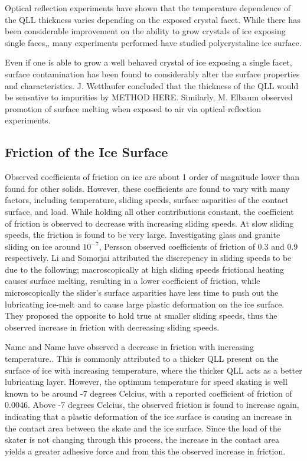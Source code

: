 Optical reflection experiments have shown that the temperature
dependence of the QLL thickness varies depending on the exposed
crystal facet.\cite{Elbaum93} While there has been considerable improvement
on the ability to grow crystals of ice exposing single
faces,\cite{Shultz14, Shultz17}, many experiments performed have studied
polycrystaline ice surface.

Even if one is able to grow a well behaved crystal of ice exposing a
single facet, surface contamination has been found to considerably
alter the surface properties and characteristics. J. Wettlaufer
concluded that the thickness of the QLL would be sensative to
impurities by METHOD HERE.\cite{Wettlaufer99} Similarly, M. Elbaum observed
promotion of surface melting when exposed to air via optical
reflection experiments.\cite{Elbaum93} 


\subsection{Friction of the Ice Surface}
Observed coefficients of friction on ice are about 1 order of
magnitude lower than found for other solids. However, these
coefficients are found to vary with many factors, including
temperature, sliding speeds, surface asparities of the contact
surface, and load.\cite{Evans76,Kietzig02,Persson01,Persson15} While
holding all other contributions constant, the coefficient of friction
is observed to decrease with increasing sliding speeds. At slow
sliding speeds, the friction is found to be very large. Investigating
glass and granite sliding on ice around $10^{-7}$, Persson observed
coefficients of friction of 0.3 and 0.9 respectively.\cite{Persson00} Li and
Somorjai attributed the discrepency in sliding speeds to be due to the
following; macroscopically at high sliding speeds frictional heating
causes surface melting, resulting in a lower coefficient of friction,
while microscopically the slider's surface asparities have less time
to push out the lubricating ice-melt and to cause large plastic
deformation on the ice surface.\cite{Li07} They proposed the
opposite to hold true at smaller sliding speeds, thus the observed
increase in friction with decreasing sliding speeds.

Name and Name have observed a decrease in friction with increasing
temperature.\cite{Evans76,Colbeck97}. This is commonly attributed to a
thicker QLL present on the surface of ice with increasing temperature,
where the thicker QLL acts as a better lubricating layer. However, the
optimum temperature for speed skating is well known to be around -7
degrees Celcius, with a reported coefficient of friction of
0.0046.\cite{Dekoning92} Above -7 degrees Celcius, the observed
friction is found to increase again, indicating that a plastic
deformation of the ice surface is causing an increase in the contact
area between the skate and the ice surface.\cite{Barnes66,Barnes71}
Since the load of the skater is not changing through this process, the
increase in the contact area yields a greater adhesive force and from
this the observed increase in friction.

